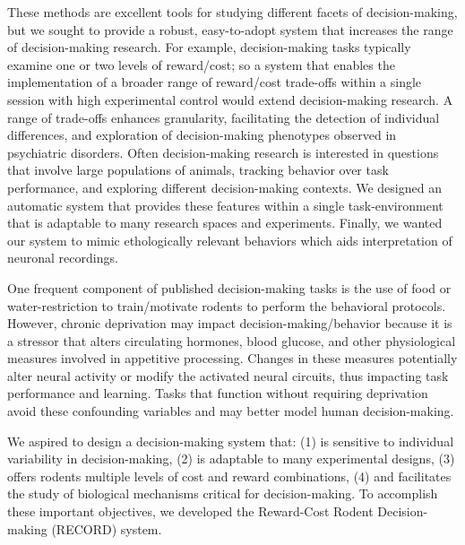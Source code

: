 \documentclass{article}
\begin{document}
These methods are excellent tools for studying different facets of decision-making, but we sought to provide a robust, easy-to-adopt system that increases the range of decision-making research. For example, decision-making tasks typically examine one or two levels of reward/cost\cite{brunton2013rats, orsini2023age, friedman2017chronic}; so a system that enables the implementation of a broader range of reward/cost trade-offs within a single session with high experimental control would extend decision-making research. A range of trade-offs enhances granularity, facilitating the detection of individual differences, and exploration of decision-making phenotypes observed in psychiatric disorders\cite{amemori2021causal, ironside2020approach}. Often decision-making research is interested in questions that involve large populations of animals, tracking behavior over task performance, and exploring different decision-making contexts\cite{friedman2015corticostriatal, friedman2017chronic, friedman2020striosomes}. We designed an automatic system\cite{vogt2021automated} that provides these features within a single task-environment that is adaptable to many research spaces and experiments. Finally, we wanted our system to mimic ethologically relevant behaviors\cite{juavinett2018decision} which aids interpretation of neuronal recordings.

\vspace{1em}

One frequent component of published decision-making tasks is the use
of food\cite{johnson2007neural, o2018low, kapanaiah2021low, orsini2023age, friedman2017chronic, foscue2012characterization} or water-restriction\cite{kira2023distributed, de2023freibox, lottem2018activation, brunton2013rats, friedman2020striosomes} to train/motivate rodents to perform the behavioral protocols. However, chronic deprivation may impact decision-making/behavior because it is a stressor that alters circulating hormones, blood glucose, and other physiological measures involved in appetitive processing\cite{stone2020ghrelin}. Changes in these measures potentially alter neural activity or modify the activated neural circuits, thus impacting task performance and learning\cite{goltstein2018food}. Tasks that function without requiring deprivation avoid these confounding variables and may better model human decision-making.

\vspace{1em}

We aspired to design a decision-making system that: (1) is sensitive to individual variability in decision-making, (2) is adaptable to many experimental designs, (3) offers rodents multiple levels of cost and reward combinations, (4) and facilitates the study of biological mechanisms critical for decision-making. To accomplish these important objectives, we developed the Reward-Cost Rodent Decision-making (RECORD) system.
\end{document}
